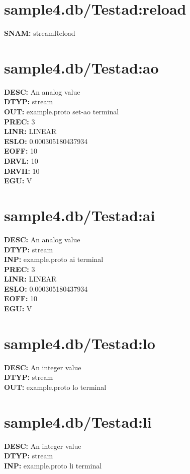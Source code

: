 \documentclass[12pt]{article}
\begin{document}
\section{sample4.db/Test\textunderscore ad:reload}
\textbf{SNAM: }streamReload \\
\newpage
\section{sample4.db/Test\textunderscore ad:ao}
\textbf{DESC: }An analog value \\
\textbf{DTYP: }stream \\
\textbf{OUT: }example.proto set-ao terminal \\
\textbf{PREC: }3 \\
\textbf{LINR: }LINEAR \\
\textbf{ESLO: }0.000305180437934 \\
\textbf{EOFF: }10 \\
\textbf{DRVL: }10 \\
\textbf{DRVH: }10 \\
\textbf{EGU: }V \\
\newpage
\section{sample4.db/Test\textunderscore ad:ai}
\textbf{DESC: }An analog value \\
\textbf{DTYP: }stream \\
\textbf{INP: }example.proto ai terminal \\
\textbf{PREC: }3 \\
\textbf{LINR: }LINEAR \\
\textbf{ESLO: }0.000305180437934 \\
\textbf{EOFF: }10 \\
\textbf{EGU: }V \\
\newpage
\section{sample4.db/Test\textunderscore ad:lo}
\textbf{DESC: }An integer value \\
\textbf{DTYP: }stream \\
\textbf{OUT: }example.proto lo terminal \\
\newpage
\section{sample4.db/Test\textunderscore ad:li}
\textbf{DESC: }An integer value \\
\textbf{DTYP: }stream \\
\textbf{INP: }example.proto li terminal \\
\newpage
\end{document}
